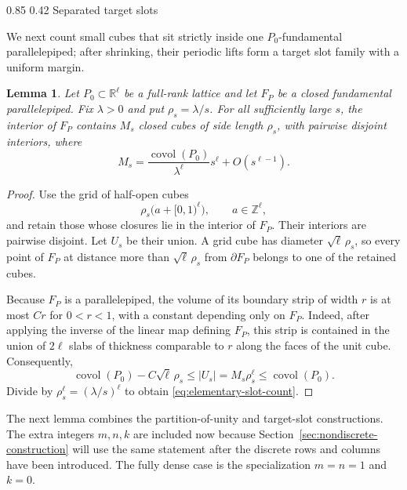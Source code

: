 \documentclass[11pt,reqno]{amsart}
\makeatletter
\numberwithin{equation}{section}
\renewcommand\subsection{\@startsection{subsection}{2}{\z@}%
  {0.85\baselineskip \@plus 0.25\baselineskip \@minus 0.10\baselineskip}%
  {0.42\baselineskip}%
  {\normalfont\bfseries}}
\newtheorem{lemma}[theorem]{Lemma}
\theoremstyle{definition}
\theoremstyle{remark}
\newcommand{\R}{\mathbb R}
\newcommand{\Z}{\mathbb Z}
\newcommand{\covol}{\operatorname{covol}}
\makeatother
\begin{document}
\subsection{Separated target slots}

We next count small cubes that sit strictly inside one $P_0$-fundamental
parallelepiped; after shrinking, their periodic lifts form a target slot
family with a uniform margin.

\begin{lemma}\label{lem:elementary-slot-count}
Let $P_0\subset\R^\ell$ be a full-rank lattice and let $F_P$ be a closed
fundamental parallelepiped.  Fix $\lambda>0$ and put $\rho_s=\lambda/s$.
For all sufficiently large $s$, the interior of $F_P$ contains
$M_s$ closed cubes of side length $\rho_s$, with pairwise disjoint
interiors, where
\begin{equation}\label{eq:elementary-slot-count}
 M_s=\frac{\covol(P_0)}{\lambda^\ell}s^\ell+O(s^{\ell-1}).
\end{equation}
\end{lemma}

\begin{proof}
Use the grid of half-open cubes
\[
 \rho_s\bigl(a+[0,1)^\ell\bigr),
 \qquad a\in\Z^\ell,
\]
and retain those whose closures lie in the interior of $F_P$.  Their
interiors are pairwise disjoint.  Let $U_s$ be their union.  A grid cube has
diameter $\sqrt\ell\,\rho_s$, so every point of $F_P$ at distance more than
$\sqrt\ell\,\rho_s$ from $\partial F_P$ belongs to one of the retained
cubes.

Because $F_P$ is a parallelepiped, the volume of its boundary strip of
width $r$ is at most $C r$ for $0<r<1$, with a constant depending only on
$F_P$.  Indeed, after applying the inverse of the linear map defining
$F_P$, this strip is contained in the union of $2\ell$ slabs of thickness
comparable to $r$ along the faces of the unit cube.  Consequently,
\[
 \covol(P_0)-C\sqrt\ell\,\rho_s
 \le |U_s|=M_s\rho_s^\ell
 \le \covol(P_0).
\]
Divide by $\rho_s^\ell=(\lambda/s)^\ell$ to obtain
\eqref{eq:elementary-slot-count}.
\end{proof}

The next lemma combines the partition-of-unity and target-slot
constructions.  The extra
integers $m,n,k$ are included now because Section~\ref{sec:nondiscrete-construction} will use the same
statement after the discrete rows and columns have been introduced.  The
fully dense case is the specialization $m=n=1$ and $k=0$.
\end{document}
